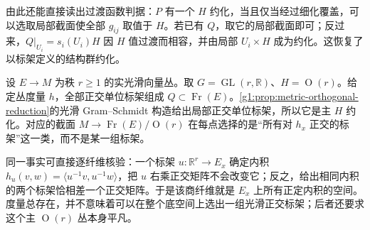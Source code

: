 由此还能直接读出过渡函数判据：\(P\) 有一个 \(H\) 约化，当且仅当经过细化覆盖，可以选取局部截面使全部 \(g_{ij}\) 取值于 \(H\)。若已有 \(Q\)，取它的局部截面即可；反过来，\(Q|_{U_i}=s_i(U_i)H\) 因 \(H\) 值过渡而相容，并由局部 \(U_i\times H\) 成为约化。这恢复了以标架定义的结构群约化。

\begin{example}\label{g1:exm:metric-as-principal-reduction}
	设 \(E\to M\) 为秩 \(r\geq1\) 的实光滑向量丛。取 \(G=\operatorname{GL}(r,\mathbb R)\)、\(H=\operatorname{O}(r)\)。给定丛度量 \(h\)，全部正交单位标架组成 \(Q\subset\operatorname{Fr}(E)\)。\cref{g1:prop:metric-orthogonal-reduction}的光滑 Gram--Schmidt 构造给出局部正交单位标架，所以它是主 \(H\) 约化。对应的截面 \(M\to\operatorname{Fr}(E)/\operatorname{O}(r)\) 在每点选择的是“所有对 \(h_x\) 正交的标架”这一类，而不是某一组标架。

	同一事实可直接逐纤维核验：一个标架 \(u:\mathbb R^r\to E_x\) 确定内积 \(h_u(v,w)=\langle u^{-1}v,u^{-1}w\rangle\)，把 \(u\) 右乘正交矩阵不会改变它；反之，给出相同内积的两个标架恰相差一个正交矩阵。于是该商纤维就是 \(E_x\) 上所有正定内积的空间。度量总存在，并不意味着可以在整个底空间上选出一组光滑正交标架；后者还要求这个主 \(\operatorname{O}(r)\) 丛本身平凡。
\end{example}
